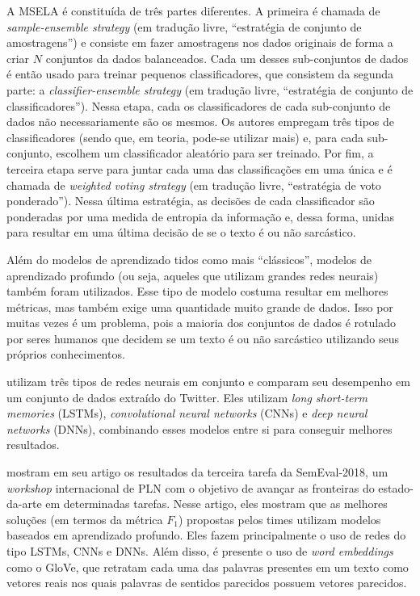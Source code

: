 A MSELA é constituída de três partes diferentes. A primeira é chamada de
\textit{sample-ensemble strategy} (em tradução livre, ``estratégia de conjunto
de amostragens'') e consiste em fazer amostragens nos dados originais de forma a
criar $N$ conjuntos da dados balanceados. Cada um desses sub-conjuntos de dados
é então usado para treinar pequenos classificadores, que consistem da segunda
parte: a \textit{classifier-ensemble strategy} (em tradução livre, ``estratégia
de conjunto de classificadores''). Nessa etapa, cada os classificadores de cada
sub-conjunto de dados não necessariamente são os mesmos. Os autores empregam
três tipos de classificadores (sendo que, em teoria, pode-se utilizar mais) e,
para cada sub-conjunto, escolhem um classificador aleatório para ser treinado.
Por fim, a terceira etapa serve para juntar cada uma das classificações em uma
única e é chamada de \textit{weighted voting strategy} (em tradução livre,
``estratégia de voto ponderado''). Nessa última estratégia, as decisões de cada
classificador são ponderadas por uma medida de entropia da informação e, dessa
forma, unidas para resultar em uma última decisão de se o texto é ou não
sarcástico.

Além do modelos de aprendizado tidos como mais ``clássicos'', modelos de
aprendizado profundo (ou seja, aqueles que utilizam grandes redes neurais)
também foram utilizados. Esse tipo de modelo costuma resultar em melhores
métricas, mas também exige uma quantidade muito grande de dados. Isso por muitas
vezes é um problema, pois a maioria dos conjuntos de dados é rotulado por seres
humanos que decidem se um texto é ou não sarcástico utilizando seus próprios
conhecimentos.

\cite{ghosh-veale:2016:fracking-sarcasm-nn} utilizam três tipos de redes neurais
em conjunto e comparam seu desempenho em um conjunto de dados extraído do
Twitter. Eles utilizam \textit{long short-term memories} (LSTMs),
\textit{convolutional neural networks} (CNNs) e \textit{deep neural networks}
(DNNs), combinando esses modelos entre si para conseguir melhores resultados.

\cite{van-hee-etal:2018:semeval} mostram em seu artigo os resultados da terceira
tarefa da SemEval-2018, um \textit{workshop} internacional de PLN com o objetivo
de avançar as fronteiras do estado-da-arte em determinadas tarefas. Nesse
artigo, eles mostram que as melhores soluções (em termos da métrica $F_1$)
propostas pelos times utilizam modelos baseados em aprendizado profundo. Eles
fazem principalmente o uso de redes do tipo LSTMs, CNNs e DNNs. Além disso, é
presente o uso de \textit{word embeddings} como o GloVe, que retratam cada uma
das palavras presentes em um texto como vetores reais nos quais palavras de
sentidos parecidos possuem vetores parecidos.

